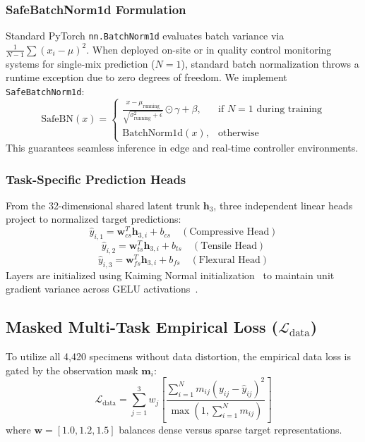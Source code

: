 \documentclass[conference]{IEEEtran}
\begin{document}
\subsubsection{SafeBatchNorm1d Formulation}
Standard PyTorch \texttt{nn.BatchNorm1d} evaluates batch variance via $\frac{1}{N-1} \sum (x_i - \mu)^2$. When deployed on-site or in quality control monitoring systems for single-mix prediction ($N=1$), standard batch normalization throws a runtime exception due to zero degrees of freedom. We implement \texttt{SafeBatchNorm1d}:
\begin{equation}
    \text{SafeBN}(x) = \begin{cases}
        \frac{x - \mu_{\text{running}}}{\sqrt{\sigma^2_{\text{running}} + \epsilon}} \odot \gamma + \beta, & \text{if } N=1 \text{ during training} \\
        \text{BatchNorm1d}(x), & \text{otherwise}
    \end{cases}
\end{equation}
This guarantees seamless inference in edge and real-time controller environments.

\subsubsection{Task-Specific Prediction Heads}
From the 32-dimensional shared latent trunk $\mathbf{h}_3$, three independent linear heads project to normalized target predictions:
\begin{equation}
    \hat{y}_{i,1} = \mathbf{w}_{cs}^T \mathbf{h}_{3,i} + b_{cs} \quad (\text{Compressive Head})
\end{equation}
\begin{equation}
    \hat{y}_{i,2} = \mathbf{w}_{ts}^T \mathbf{h}_{3,i} + b_{ts} \quad (\text{Tensile Head})
\end{equation}
\begin{equation}
    \hat{y}_{i,3} = \mathbf{w}_{fs}^T \mathbf{h}_{3,i} + b_{fs} \quad (\text{Flexural Head})
\end{equation}
Layers are initialized using Kaiming Normal initialization~\cite{he2015delving} to maintain unit gradient variance across GELU activations~\cite{hendrycks2016gelu}.

\subsection{Masked Multi-Task Empirical Loss ($\mathcal{L}_{\text{data}}$)}
To utilize all 4,420 specimens without data distortion, the empirical data loss is gated by the observation mask $\mathbf{m}_i$:
\begin{equation}
    \mathcal{L}_{\text{data}} = \sum_{j=1}^3 w_j \left[ \frac{\sum_{i=1}^N m_{ij} \left(y_{ij} - \hat{y}_{ij}\right)^2}{\max\left(1, \sum_{i=1}^N m_{ij}\right)} \right]
\end{equation}
where $\mathbf{w} = [1.0, 1.2, 1.5]$ balances dense versus sparse target representations.
\end{document}
